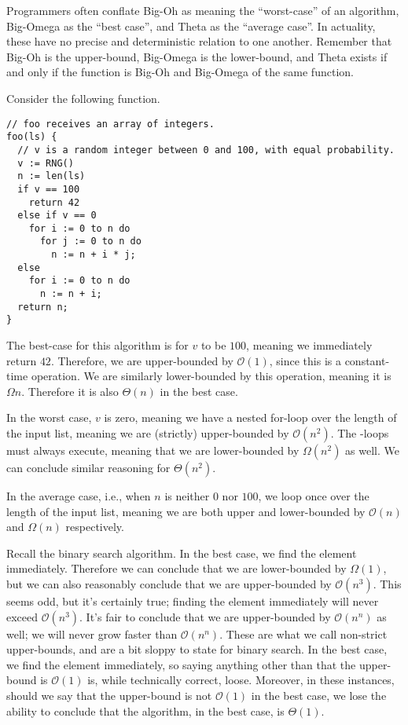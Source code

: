 Programmers often conflate Big-Oh as meaning the ``worst-case'' of an algorithm, Big-Omega as the ``best case'', and Theta as the ``average case''. In actuality, these have no precise and deterministic relation to one another. Remember that Big-Oh is the upper-bound, Big-Omega is the lower-bound, and Theta exists if and only if the function is Big-Oh and Big-Omega of the same function.

\example Consider the following function.
\begin{verbatim}
// foo receives an array of integers.
foo(ls) {
  // v is a random integer between 0 and 100, with equal probability.
  v := RNG()
  n := len(ls)
  if v == 100
    return 42
  else if v == 0
    for i := 0 to n do
      for j := 0 to n do
        n := n + i * j;
  else
    for i := 0 to n do
      n := n + i;
  return n;
}
\end{verbatim}

The best-case for this algorithm is for $v$ to be $100$, meaning we immediately return $42$. Therefore, we are upper-bounded by $\mathcal{O}(1)$, since this is a constant-time operation. We are similarly lower-bounded by this operation, meaning it is $\Omega{n}$. Therefore it is also $\Theta(n)$ in the best case.

In the worst case, $v$ is zero, meaning we have a nested for-loop over the length of the input list, meaning we are (strictly) upper-bounded by $\mathcal{O}(n^2)$. The -loops must always execute, meaning that we are lower-bounded by $\Omega(n^2)$ as well. We can conclude similar reasoning for $\Theta(n^2)$.

In the average case, i.e., when $n$ is neither $0$ nor $100$, we loop once over the length of the input list, meaning we are both upper and lower-bounded by $\mathcal{O}(n)$ and $\Omega(n)$ respectively.

\example Recall the binary search algorithm. In the best case, we find the element immediately. Therefore we can conclude that we are lower-bounded by $\Omega(1)$, but we can also reasonably conclude that we are upper-bounded by $\mathcal{O}(n^3)$. This seems odd, but it's certainly true; finding the element immediately will never exceed $\mathcal{O}(n^3)$. It's fair to conclude that we are upper-bounded by $\mathcal{O}(n^n)$ as well; we will never grow faster than $\mathcal{O}(n^n)$. These are what we call non-strict upper-bounds, and are a bit sloppy to state for binary search. In the best case, we find the element immediately, so saying anything other than that the upper-bound is $\mathcal{O}(1)$ is, while technically correct, loose. Moreover, in these instances, should we say that the upper-bound is not $\mathcal{O}(1)$ in the best case, we lose the ability to conclude that the algorithm, in the best case, is $\Theta(1)$. 


